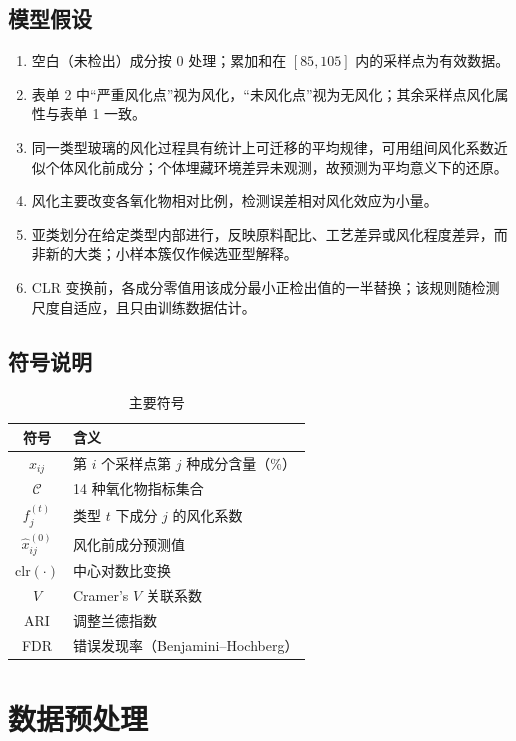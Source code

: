 \documentclass[fontset=windows, UTF8, 12pt, a4paper]{ctexart}
\begin{document}
\subsection{模型假设}
\begin{enumerate}[leftmargin=2em]
  \item 空白（未检出）成分按 $0$ 处理；累加和在 $[85,105]$ 内的采样点为有效数据。
  \item 表单 2 中“严重风化点”视为风化，“未风化点”视为无风化；其余采样点风化属性与表单 1 一致。
  \item 同一类型玻璃的风化过程具有统计上可迁移的平均规律，可用组间风化系数近似个体风化前成分；个体埋藏环境差异未观测，故预测为平均意义下的还原。
  \item 风化主要改变各氧化物相对比例，检测误差相对风化效应为小量。
  \item 亚类划分在给定类型内部进行，反映原料配比、工艺差异或风化程度差异，而非新的大类；小样本簇仅作候选亚型解释。
  \item CLR 变换前，各成分零值用该成分最小正检出值的一半替换；该规则随检测尺度自适应，且只由训练数据估计。
\end{enumerate}

\subsection{符号说明}
\begin{table}[H]
\centering
\caption{主要符号}
\begin{tabular}{cl}
\toprule
符号 & 含义 \\
\midrule
$x_{ij}$ & 第 $i$ 个采样点第 $j$ 种成分含量（\%） \\
$\mathcal{C}$ & 14 种氧化物指标集合 \\
$f_j^{(t)}$ & 类型 $t$ 下成分 $j$ 的风化系数 \\
$\hat{x}_{ij}^{(0)}$ & 风化前成分预测值 \\
$\mathrm{clr}(\cdot)$ & 中心对数比变换 \\
$V$ & Cramer's $V$ 关联系数 \\
ARI & 调整兰德指数 \\
FDR & 错误发现率（Benjamini--Hochberg） \\
\bottomrule
\end{tabular}
\end{table}

\section{数据预处理}
\end{document}
